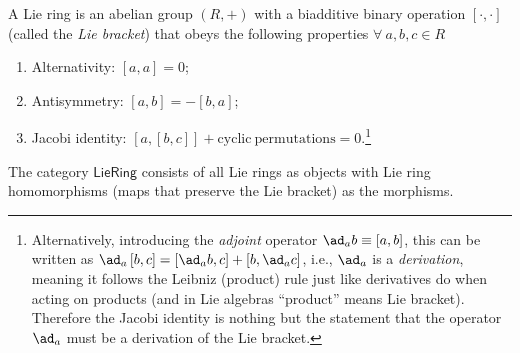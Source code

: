 \begin{defn}
    A Lie ring is an abelian group $(R,+)$ with a biadditive binary operation $[\cdot,\cdot]$
    (called the \emph{Lie bracket}) that obeys the following properties
    $\forall~a,b,c\in R$ 
    \begin{enumerate}
    \item Alternativity: $[a,a]=0$;
    \item Antisymmetry: $[a,b]=-[b,a]$; 
    \item Jacobi identity: $[a,[b,c]]+\mathrm{cyclic~permutations}=0$.\footnote{Alternatively, introducing the \emph{adjoint} operator $\ad_{a}b\equiv\left[a,b\right]$,
    this can be written as $\ad_{a}\left[b,c\right]=\left[\ad_{a}b,c\right]+\left[b,\ad_{a}c\right]$,
    i.e., $\ad_{a}$ is a \emph{derivation}, meaning
    it follows the Leibniz (product) rule just like derivatives do when
    acting on products (and in Lie algebras ``product'' means Lie bracket).
    Therefore the Jacobi identity is nothing but the statement that the
    operator $\ad_a$ must be a derivation of the Lie bracket.}
    \end{enumerate}
    The category $\mathsf{LieRing}$ consists of all Lie rings as objects
    with Lie ring homomorphisms (maps that preserve the Lie bracket) as
    the morphisms.
\end{defn}

